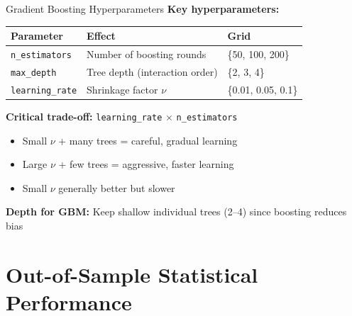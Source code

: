 \documentclass[10pt]{beamer}
\begin{document}

\begin{frame}{Gradient Boosting Hyperparameters}
  \textbf{Key hyperparameters:}

  \vspace{0.3em}
  \begin{tabular}{lll}
    \toprule
    \textbf{Parameter} & \textbf{Effect} & \textbf{Grid} \\
    \midrule
    \texttt{n\_estimators} & Number of boosting rounds & \{50, 100, 200\} \\
    \texttt{max\_depth} & Tree depth (interaction order) & \{2, 3, 4\} \\
    \texttt{learning\_rate} & Shrinkage factor $\nu$ & \{0.01, 0.05, 0.1\} \\
    \bottomrule
  \end{tabular}

  \vspace{0.5em}
  \textbf{Critical trade-off:} \texttt{learning\_rate} $\times$ \texttt{n\_estimators}
  \begin{itemize}
    \item Small $\nu$ + many trees = careful, gradual learning
    \item Large $\nu$ + few trees = aggressive, faster learning
    \item Small $\nu$ generally better but slower
  \end{itemize}

  \vspace{0.3em}
  \textbf{Depth for GBM:} Keep shallow individual trees (2--4) since boosting reduces bias
\end{frame}

\section{Out-of-Sample Statistical Performance}
\end{document}
